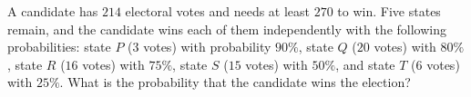 A candidate has $214$ electoral votes and needs at least $270$ to win. Five states remain, and the candidate wins each of them independently with the following probabilities: state $P$ ($3$ votes) with probability $90\%$, state $Q$ ($20$ votes) with $80\%$, state $R$ ($16$ votes) with $75\%$, state $S$ ($15$ votes) with $50\%$, and state $T$ ($6$ votes) with $25\%$. What is the probability that the candidate wins the election?
